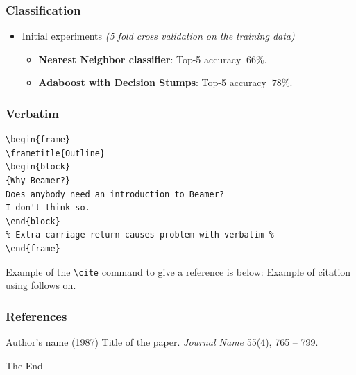 \documentclass{beamer}
\begin{document}
\begin{frame}
\frametitle{Classification}
\begin{itemize}
\item Initial experiments \textit{(5 fold cross validation on the training data)}
\begin{itemize}
\item \textbf{Nearest Neighbor classifier}: Top-5 accuracy $~66\%$.
\item \textbf{Adaboost with Decision Stumps}: Top-5 accuracy $~78\%$.
\end{itemize}
\end{itemize}
\end{frame}

\begin{frame}[fragile] %
\frametitle{Verbatim}
\begin{example}
\begin{verbatim}
\begin{frame}
\frametitle{Outline}
\begin{block}
{Why Beamer?}
Does anybody need an introduction to Beamer?
I don't think so.
\end{block}
% Extra carriage return causes problem with verbatim %
\end{frame}\end{verbatim} 
\end{example}
\end{frame}
 
\begin{frame}[fragile]  %
Example of the \verb|\cite| command to give a reference is below:
Example of citation using \cite{key1} follows on.
\end{frame}
 
\begin{frame}
\frametitle{References}
\footnotesize{
\begin{thebibliography}{99}
  Author's name (1987)
 \newblock Title of the paper.
 \newblock \emph{Journal Name} 55(4), 765 -- 799.
\end{thebibliography}
}
\end{frame}
 
\begin{frame}
\centerline{The End}
\end{frame}
\end{document}
